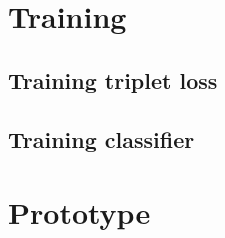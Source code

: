 \section{Training}
\label{sec:Training}

\subsection{Training triplet loss}
\label{sub:Training-Triplet-Loss}

\subsection{Training classifier}
\label{sub:Training-Classifier}

\section{Prototype}
\label{sec:Prototype}
